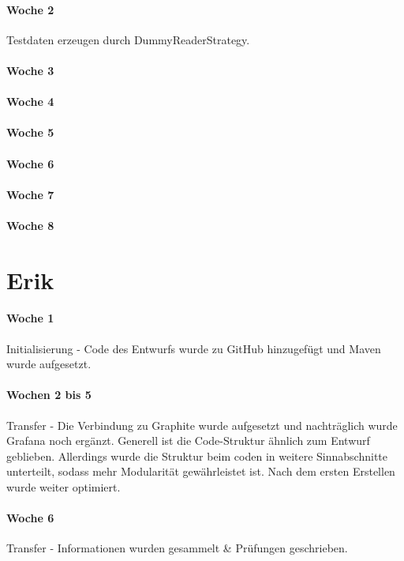 \paragraph{Woche 2}
Testdaten erzeugen durch DummyReaderStrategy.
\paragraph{Woche 3}

\paragraph{Woche 4}

\paragraph{Woche 5}

\paragraph{Woche 6}

\paragraph{Woche 7}

\paragraph{Woche 8}

\newpage
\section{Erik}
\paragraph{Woche 1}
Initialisierung - Code des Entwurfs wurde zu GitHub hinzugefügt und Maven wurde aufgesetzt.
\paragraph{Wochen 2 bis 5}
Transfer - Die Verbindung zu Graphite wurde aufgesetzt und nachträglich wurde Grafana noch ergänzt. Generell ist die Code-Struktur ähnlich zum Entwurf geblieben. Allerdings wurde die Struktur beim coden in weitere Sinnabschnitte unterteilt, sodass mehr Modularität gewährleistet ist. Nach dem ersten Erstellen wurde weiter optimiert.
\paragraph{Woche 6}
Transfer - Informationen wurden gesammelt \& Prüfungen geschrieben.
